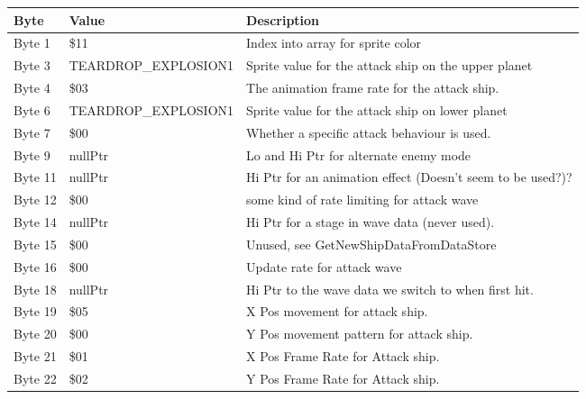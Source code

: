 \begin{figure}[H]
{\begin{adjustbox}{width=12cm}
\begin{tabular}{lll}
\toprule
 Byte    & Value                     & Description                                                        \\
\midrule
 Byte 1  & \$11                       & Index into array for sprite color                                  \\
 Byte 3  & TEARDROP\_EXPLOSION1       & Sprite value for the attack ship on the upper planet               \\
 Byte 4  & \$03                       & The animation frame rate for the attack ship.                      \\
 Byte 6  & TEARDROP\_EXPLOSION1       & Sprite value for the attack ship on lower planet                   \\
 Byte 7  & \$00                       & Whether a specific attack behaviour is used.                       \\
 Byte 9  & nullPtr                   & Lo and Hi Ptr for alternate enemy mode                             \\
 Byte 11 & nullPtr                   & Hi Ptr for an animation effect (Doesn't seem to be used?)?         \\
 Byte 12 & \$00                       & some kind of rate limiting for attack wave                         \\
 Byte 14 & nullPtr                   & Hi Ptr for a stage in wave data (never used).                      \\
 Byte 15 & \$00                       & Unused, see GetNewShipDataFromDataStore                            \\
 Byte 16 & \$00                       & Update rate for attack wave                                        \\
 Byte 18 & nullPtr                   & Hi Ptr to the wave data we switch to when first hit.               \\
 Byte 19 & \$05                       & X Pos movement for attack ship.                                    \\
 Byte 20 & \$00                       & Y Pos movement pattern for attack ship.                            \\
 Byte 21 & \$01                       & X Pos Frame Rate for Attack ship.                                  \\
 Byte 22 & \$02                       & Y Pos Frame Rate for Attack ship.                                  \\

\end{tabular}
\end{adjustbox}}
\end{figure}
